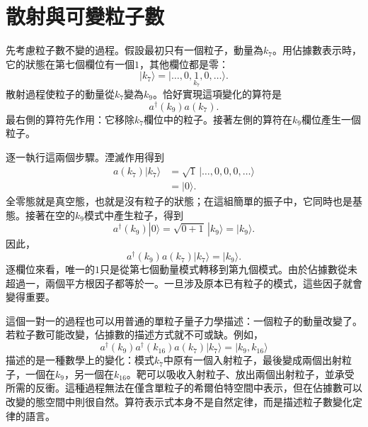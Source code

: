 \section{散射與可變粒子數}

先考慮粒子數不變的過程。假設最初只有一個粒子，動量為\(k_7\)。用佔據數表示時，它的狀態在第七個欄位有一個\(1\)，其他欄位都是零：
\begin{equation}
|k_7\rangle
=
|\ldots,0,\underset{k_7}{1},0,\ldots\rangle.
\end{equation}
散射過程使粒子的動量從\(k_7\)變為\(k_9\)。恰好實現這項變化的算符是
\begin{equation}
a^\dagger(k_9)a(k_7).
\end{equation}
最右側的算符先作用：它移除\(k_7\)欄位中的粒子。接著左側的算符在\(k_9\)欄位產生一個粒子。

\begin{classroomqa}
\end{classroomqa}

逐一執行這兩個步驟。湮滅作用得到
\begin{align}
a(k_7)|k_7\rangle
&=
\sqrt{1}\,|\ldots,0,0,0,\ldots\rangle\\
&=|0\rangle.
\end{align}
全零態就是真空態，也就是沒有粒子的狀態；在這組簡單的振子中，它同時也是基態。接著在空的\(k_9\)模式中產生粒子，得到
\begin{equation}
a^\dagger(k_9)|0\rangle
=\sqrt{0+1}\,|k_9\rangle
=|k_9\rangle.
\end{equation}
因此，
\begin{equation}
a^\dagger(k_9)a(k_7)|k_7\rangle=|k_9\rangle.
\end{equation}
逐欄位來看，唯一的\(1\)只是從第七個動量模式轉移到第九個模式。由於佔據數從未超過一，兩個平方根因子都等於一。一旦涉及原本已有粒子的模式，這些因子就會變得重要。

這個一對一的過程也可以用普通的單粒子量子力學描述：一個粒子的動量改變了。若粒子數可能改變，佔據數的描述方式就不可或缺。例如，
\begin{equation}
a^\dagger(k_9)a^\dagger(k_{16})a(k_7)|k_7\rangle
=|k_9,k_{16}\rangle
\end{equation}
描述的是一種數學上的變化：模式\(k_7\)中原有一個入射粒子，最後變成兩個出射粒子，一個在\(k_9\)，另一個在\(k_{16}\)。靶可以吸收入射粒子、放出兩個出射粒子，並承受所需的反衝。這種過程無法在僅含單粒子的希爾伯特空間中表示，但在佔據數可以改變的態空間中則很自然。算符表示式本身不是自然定律，而是描述粒子數變化定律的語言。

